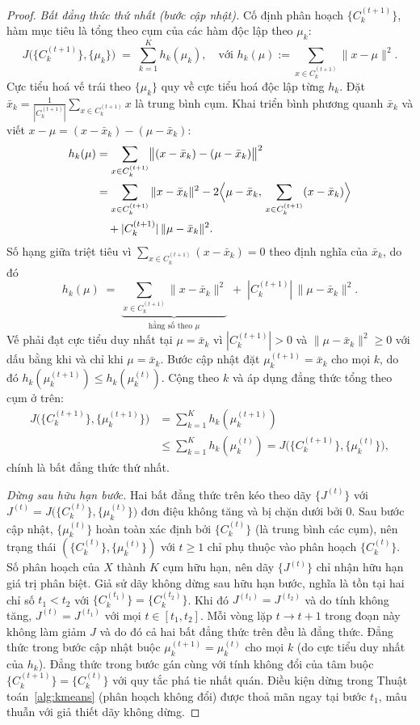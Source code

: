 \begin{proof}
\emph{Bất đẳng thức thứ nhất (bước cập nhật).} Cố định phân hoạch $\{C_k^{(t+1)}\}$, hàm mục tiêu là tổng theo cụm của các hàm độc lập theo $\mu_k$:
\[
    J\bigl(\{C_k^{(t+1)}\}, \{\mu_k\}\bigr) \;=\; \sum_{k=1}^K h_k(\mu_k), \quad \text{với } h_k(\mu) := \sum_{x \in C_k^{(t+1)}} \|x - \mu\|^2.
\]
Cực tiểu hoá vế trái theo $\{\mu_k\}$ quy về cực tiểu hoá độc lập từng $h_k$. Đặt $\bar{x}_k = \frac{1}{|C_k^{(t+1)}|} \sum_{x \in C_k^{(t+1)}} x$ là trung bình cụm. Khai triển bình phương quanh $\bar{x}_k$ và viết $x - \mu = (x - \bar{x}_k) - (\mu - \bar{x}_k)$:
\begin{align*}
    h_k(\mu) &= \sum_{x \in C_k^{(t+1)}} \bigl\|(x - \bar{x}_k) - (\mu - \bar{x}_k)\bigr\|^2 \\
             &= \sum_{x \in C_k^{(t+1)}} \|x - \bar{x}_k\|^2 - 2 \Bigl\langle \mu - \bar{x}_k,\, \sum_{x \in C_k^{(t+1)}} (x - \bar{x}_k) \Bigr\rangle \\
             &\quad + |C_k^{(t+1)}| \, \|\mu - \bar{x}_k\|^2.
\end{align*}
Số hạng giữa triệt tiêu vì $\sum_{x \in C_k^{(t+1)}} (x - \bar{x}_k) = 0$ theo định nghĩa của $\bar{x}_k$, do đó
\[
    h_k(\mu) \;=\; \underbrace{\sum_{x \in C_k^{(t+1)}} \|x - \bar{x}_k\|^2}_{\text{hằng số theo } \mu} \;+\; |C_k^{(t+1)}| \, \|\mu - \bar{x}_k\|^2.
\]
Vế phải đạt cực tiểu duy nhất tại $\mu = \bar{x}_k$ vì $|C_k^{(t+1)}| > 0$ và $\|\mu - \bar{x}_k\|^2 \geq 0$ với dấu bằng khi và chỉ khi $\mu = \bar{x}_k$. Bước cập nhật đặt $\mu_k^{(t+1)} = \bar{x}_k$ cho mọi $k$, do đó $h_k(\mu_k^{(t+1)}) \leq h_k(\mu_k^{(t)})$. Cộng theo $k$ và áp dụng đẳng thức tổng theo cụm ở trên:
\begin{align*}
    J\bigl(\{C_k^{(t+1)}\}, \{\mu_k^{(t+1)}\}\bigr)
        &= \sum_{k=1}^K h_k(\mu_k^{(t+1)}) \\
        &\leq \sum_{k=1}^K h_k(\mu_k^{(t)})
         = J\bigl(\{C_k^{(t+1)}\}, \{\mu_k^{(t)}\}\bigr),
\end{align*}
chính là bất đẳng thức thứ nhất.

\emph{Dừng sau hữu hạn bước.} Hai bất đẳng thức trên kéo theo dãy $\{J^{(t)}\}$ với $J^{(t)} = J\bigl(\{C_k^{(t)}\}, \{\mu_k^{(t)}\}\bigr)$ đơn điệu không tăng và bị chặn dưới bởi $0$. Sau bước cập nhật, $\{\mu_k^{(t)}\}$ hoàn toàn xác định bởi $\{C_k^{(t)}\}$ (là trung bình các cụm), nên trạng thái $(\{C_k^{(t)}\}, \{\mu_k^{(t)}\})$ với $t \geq 1$ chỉ phụ thuộc vào phân hoạch $\{C_k^{(t)}\}$. Số phân hoạch của $X$ thành $K$ cụm hữu hạn, nên dãy $\{J^{(t)}\}$ chỉ nhận hữu hạn giá trị phân biệt. Giả sử dãy không dừng sau hữu hạn bước, nghĩa là tồn tại hai chỉ số $t_1 < t_2$ với $\{C_k^{(t_1)}\} = \{C_k^{(t_2)}\}$. Khi đó $J^{(t_1)} = J^{(t_2)}$ và do tính không tăng, $J^{(t)} = J^{(t_1)}$ với mọi $t \in [t_1, t_2]$. Mỗi vòng lặp $t \to t+1$ trong đoạn này không làm giảm $J$ và do đó cả hai bất đẳng thức trên đều là đẳng thức. Đẳng thức trong bước cập nhật buộc $\mu_k^{(t+1)} = \mu_k^{(t)}$ cho mọi $k$ (do cực tiểu duy nhất của $h_k$). Đẳng thức trong bước gán cùng với tính không đổi của tâm buộc $\{C_k^{(t+1)}\} = \{C_k^{(t)}\}$ với quy tắc phá tie nhất quán. Điều kiện dừng trong Thuật toán~\ref{alg:kmeans} (phân hoạch không đổi) được thoả mãn ngay tại bước $t_1$, mâu thuẫn với giả thiết dãy không dừng.


\end{proof}
